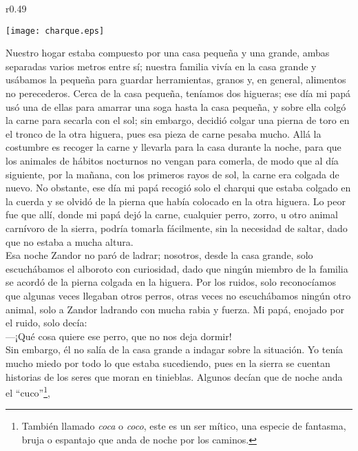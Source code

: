 \ifdefined\EnableIncludeImages
\begin{wrapfigure}{r}{0.49\textwidth}
  \begin{center}
  \vspace{-20pt}
    \texttt{[image: charque.eps]}
  \end{center}
  \vspace{-20pt}
\end{wrapfigure}
\fi
Nuestro hogar estaba compuesto por una casa pequeña y una grande, ambas separadas varios metros entre sí; nuestra familia vivía en la casa grande y usábamos la pequeña para guardar herramientas, granos y, en general, alimentos no perecederos.
Cerca de la casa pequeña, teníamos dos higueras; ese día mi papá usó una de ellas para amarrar una soga hasta la casa pequeña, y sobre ella colgó la carne para secarla con el sol; sin embargo, decidió colgar una pierna de toro en el tronco de la otra higuera, pues esa pieza de carne pesaba mucho.
Allá la costumbre es recoger la carne y llevarla para la casa durante la noche, para que los animales de hábitos nocturnos no vengan para comerla, de modo que al día siguiente, por la mañana, con los primeros rayos de sol, la carne era colgada de nuevo. 
No obstante, ese día mi papá recogió solo el charqui que estaba colgado en la cuerda y se olvidó de la pierna que había colocado en la otra higuera.
Lo peor fue que allí, donde mi papá dejó la carne, cualquier perro, zorro, u otro animal carnívoro de la sierra, podría tomarla fácilmente, sin la necesidad de saltar, dado que no estaba a mucha altura.\\\indent
Esa noche Zandor no paró de ladrar; nosotros, desde la casa grande, solo escuchábamos el alboroto con curiosidad, dado que ningún miembro de la familia se acordó de la pierna colgada en la higuera. 
Por los ruidos, solo reconocíamos que algunas veces llegaban otros perros, otras veces no escuchábamos ningún otro animal, solo a Zandor ladrando con mucha rabia y fuerza. 
Mi papá, enojado por el ruido, solo decía:\\\indent
---¡Qué cosa quiere ese perro, que no nos deja dormir!\\\indent
Sin embargo, él no salía de la casa grande a indagar sobre la situación. 
Yo tenía mucho miedo por todo lo que estaba sucediendo, pues en la sierra se cuentan historias de los seres que moran en tinieblas.
Algunos decían que de noche anda el ``cuco''\footnote{También llamado \textit{coca} o \textit{coco}, este es un ser mítico, una especie de fantasma, bruja o espantajo que anda de noche por los caminos.}, 
